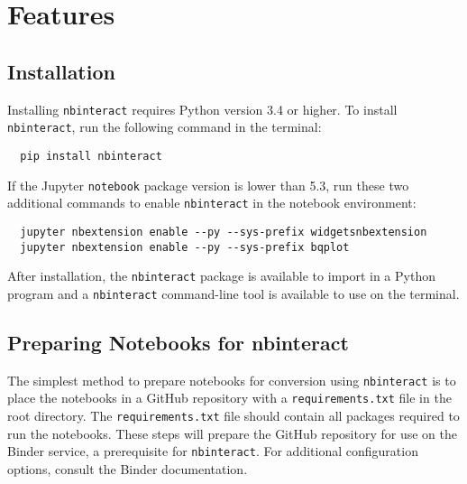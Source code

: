 \documentclass[nobib]{tufte-handout}
\newcommand{\code}[1]{\texttt{#1}}
\begin{document}


\section{Features} %
\label{sec:features}

\subsection{Installation} %
\label{sub:installation}

Installing \code{nbinteract} requires Python version 3.4 or higher. To install
\code{nbinteract}, run the following command in the terminal:

\begin{verbatim}
  pip install nbinteract
\end{verbatim}

If the Jupyter \code{notebook} package version is lower than 5.3, run these two
additional commands to enable \code{nbinteract} in the notebook environment:

\begin{verbatim}
  jupyter nbextension enable --py --sys-prefix widgetsnbextension
  jupyter nbextension enable --py --sys-prefix bqplot
\end{verbatim}

After installation, the \code{nbinteract} package is available to import in a
Python program and a \code{nbinteract} command-line tool is available to use on
the terminal.


\subsection{Preparing Notebooks for nbinteract} %
\label{sub:preparing_notebooks_for_nbinteract}

The simplest method to prepare notebooks for conversion using \code{nbinteract}
is to place the notebooks in a GitHub repository with a \code{requirements.txt}
file in the root directory. The \code{requirements.txt} file should contain all
packages required to run the notebooks. These steps will prepare the GitHub
repository for use on the Binder service, a prerequisite for \code{nbinteract}.
For additional configuration options, consult the Binder
documentation.
\end{document}
